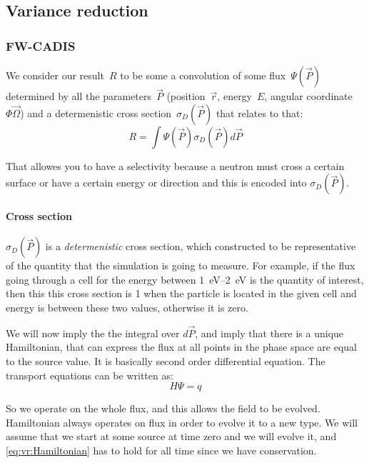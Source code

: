 \subsection{Variance reduction}

\subsubsection{FW-CADIS}
We consider our result~$R$ to be some a convolution of some
flux~$\Psi(\vec{P})$ determined by all the parameters~$\vec{P}$
(position~$\vec{r}$, energy~$E$, angular
coordinate~$\Phi\vec{\Omega}$) and a determenistic cross
section~$\sigma_D(\vec{P})$ that relates to that:
\begin{equation}
  \label{eq:vr:result}
  R = \int \Psi(\vec{P}) \sigma_D(\vec{P}) d\vec{P}
\end{equation}

That allowes you to have a selectivity because a neutron must cross a
certain surface or have a certain energy or direction and this is encoded into $\sigma_D(\vec{P})$.

\paragraph{Cross section}
$\sigma_D(\vec{P})$ is a {\em determenistic} cross section, which constructed to be representative of the quantity
that the simulation is going to measure. For example, if the flux going through a cell for the energy between
\SIrange[range-phrase=\ and\ ]{1}{2}{\electronvolt} is the quantity of interest, then this
this cross section is 1 when the particle is located in the given cell and energy is between these two values,
otherwise it is zero.

\bigskip

We will now imply the the integral over $d\vec{P}$, and imply that there is a unique Hamiltonian,
that can express the flux at all points in the phase space are equal to the source value. It is basically
second order differential equation. The transport equations can be written as:
\begin{equation}
  \label{eq:vr:Hamiltonian}
  H \Psi = q
\end{equation}


So we operate on the whole flux, and this allows the field to be evolved.
Hamiltonian always operates on flux in order to evolve it to a new type.
We will assume that we start at some source at time zero and we will evolve it, and \eqref{eq:vr:Hamiltonian} has to
hold for all time since we have conservation.

